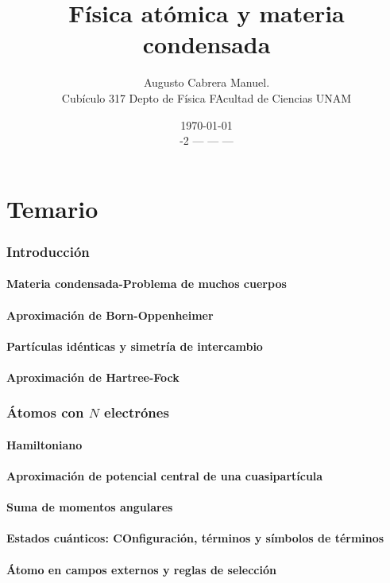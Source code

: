 \documentclass[]{article}
\title{Física atómica y materia condensada}
\author{Augusto Cabrera Manuel.\\ Cubículo 317 Depto de Física FAcultad de Ciencias UNAM}
\date{\today\\ \sem 2018-2 \gru--- \hor--- \sal---}
\begin{document}
\maketitle
\part*{Temario}

\section{Introducción}
\subsection{Materia condensada-Problema de muchos cuerpos}
\subsection{Aproximación de Born-Oppenheimer}
\subsection{Partículas idénticas y simetría de intercambio}
\subsection{Aproximación de Hartree-Fock}

\section{Átomos con $N$ electrónes}
\subsection{Hamiltoniano}
\subsection{Aproximación de potencial central de una cuasipartícula}
\subsection{Suma de momentos angulares}
\subsection{Estados cuánticos: COnfiguración, términos y símbolos de términos}
\subsection{Átomo en campos externos y reglas de selección}
\end{document}
